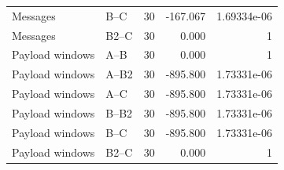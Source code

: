 \begin{table}[t]
\begin{tabular}{llrrr}
Messages & B--C & 30 & -167.067 & 1.69334e-06 \\
Messages & B2--C & 30 & 0.000 & 1 \\
Payload windows & A--B & 30 & 0.000 & 1 \\
Payload windows & A--B2 & 30 & -895.800 & 1.73331e-06 \\
Payload windows & A--C & 30 & -895.800 & 1.73331e-06 \\
Payload windows & B--B2 & 30 & -895.800 & 1.73331e-06 \\
Payload windows & B--C & 30 & -895.800 & 1.73331e-06 \\
Payload windows & B2--C & 30 & 0.000 & 1 \\
\bottomrule
\end{tabular}
\end{table}

